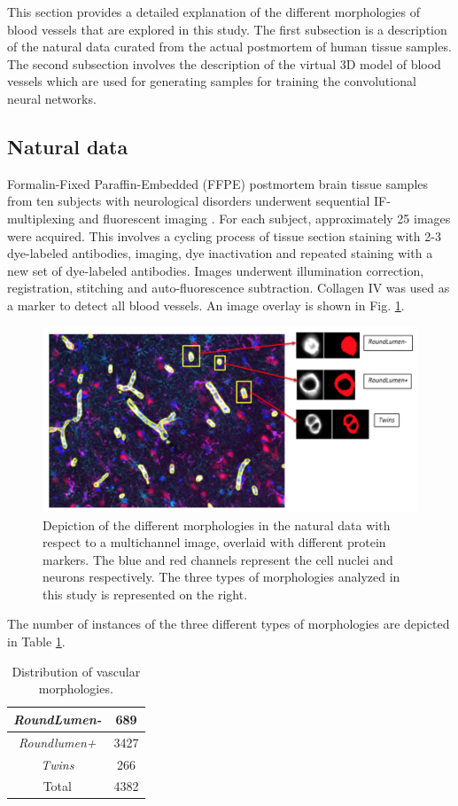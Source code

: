 This section provides a detailed explanation of the different morphologies of blood vessels that are explored in this study. The first subsection is a description of the natural data curated from the actual postmortem of human tissue samples. The second subsection involves the description of the virtual 3D model of blood vessels which are used for generating samples for training the convolutional neural networks.

\subsection{Natural data}
Formalin-Fixed Paraffin-Embedded (FFPE) postmortem brain tissue samples from ten subjects with neurological disorders underwent sequential IF-multiplexing and fluorescent imaging \cite{gerdes2013highly}. For each subject, approximately 25 images were acquired.   This involves a cycling process of tissue section staining with 2-3 dye-labeled antibodies, imaging, dye inactivation and repeated staining with a new set of dye-labeled antibodies. Images underwent illumination correction, registration, stitching and auto-fluorescence subtraction. Collagen IV was used as a marker to detect all blood vessels. An image overlay is shown in Fig. \ref{fig:morphologies}.

\begin{figure}[ht!]
\centering
\includegraphics[width=1.0\textwidth]{img/morphologies}
\caption{Depiction of the different morphologies in the natural data with respect to a multichannel image, overlaid with different protein markers. The blue and red channels represent the cell nuclei and neurons respectively. The three types of morphologies analyzed in this study is represented on the right.}
\label{fig:morphologies}
\end{figure}

The number of instances of the three different types of morphologies are depicted in Table \ref{table:classes}.
\begin{table}[ht!]
\caption{Distribution of vascular morphologies.}
\centering
\begin{tabular}{ | c | c |} 
\hline
\textit{RoundLumen-} & 689 \\ 
\hline
\textit{Roundlumen+} & 3427 \\ 
\hline
\textit{Twins} & 266 \\ 
\hline
Total & 4382 \\ 
\hline
\end{tabular}
\label{table:classes}
\end{table}

